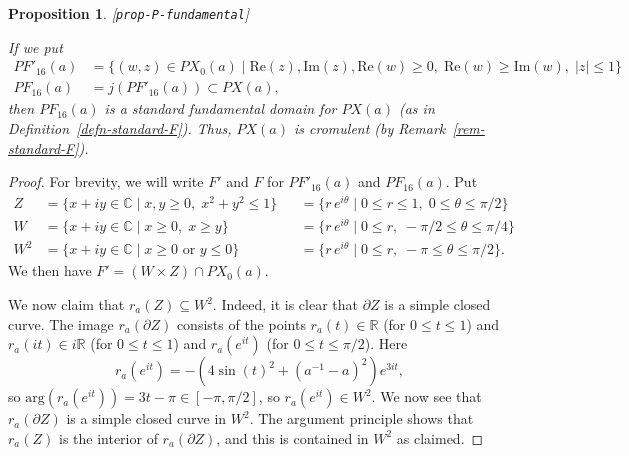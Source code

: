 \documentclass[reqno]{amsart}
\newcommand{\lbl}[1]{\label{#1}\textup{[\texttt{#1}]}\par}
\newcommand{\lbl}{\label}
\newcommand{\tht}       {\theta}
\newcommand{\R}         {{\mathbb{R}}}
\newcommand{\C}         {{\mathbb{C}}}
\newcommand{\st}        {\;|\;}
\newcommand{\tm}        {\times}
\newcommand{\sse}       {\subseteq}
\renewcommand{\:}{\colon}
\newtheorem{proposition}[theorem]{Proposition}
\theoremstyle{definition}
\begin{document}
\begin{proposition}\lbl{prop-P-fundamental}
 If we put
 \begin{align*}
  PF'_{16}(a) &= \{(w,z)\in PX_0(a)\st
           \text{Re}(z),\text{Im}(z),\text{Re}(w)\geq 0,\;
           \text{Re}(w)\geq\text{Im}(w),\;|z|\leq 1\} \\
  PF_{16}(a) &= j(PF'_{16}(a))\subset PX(a),
 \end{align*}
 then $PF_{16}(a)$ is a standard fundamental domain for $PX(a)$ (as in
 Definition~\ref{defn-standard-F}).  Thus, $PX(a)$ is cromulent (by
 Remark~\ref{rem-standard-F}).
\end{proposition}
\begin{proof}
 For brevity, we will write $F'$ and $F$ for $PF'_{16}(a)$ and
 $PF_{16}(a)$.  Put
 \begin{align*}
  Z   &= \{x+iy\in\C\st x,y\geq 0,\;x^2+y^2\leq 1\} &
      &= \{r\,e^{i\tht}\st 0\leq r\leq 1,\;0\leq\tht\leq\pi/2\} \\
  W   &= \{x+iy\in\C\st x\geq 0,\; x\geq y\} &
      &= \{r\,e^{i\tht}\st 0\leq r,\; -\pi/2\leq\tht\leq\pi/4\} \\
  W^2 &= \{x+iy\in\C\st x\geq 0 \text{ or } y\leq 0\} &
      &= \{r\,e^{i\tht}\st 0\leq r,\; -\pi\leq\tht\leq\pi/2\}.
 \end{align*}
 We then have $F'=(W\tm Z)\cap PX_0(a)$.

 We now claim that $r_a(Z)\sse W^2$.  Indeed, it is clear that
 $\partial Z$ is a simple closed curve.  The image $r_a(\partial Z)$
 consists of the points $r_a(t)\in\R$ (for $0\leq t\leq 1$) and
 $r_a(it)\in i\R$ (for $0\leq t\leq 1$) and $r_a(e^{it})$ (for
 $0\leq t\leq\pi/2$).  Here
 \[ r_a(e^{it}) = - (4\sin(t)^2+(a^{-1}-a)^2) e^{3it}, \]
 so $\text{arg}(r_a(e^{it}))=3t-\pi\in[-\pi,\pi/2]$, so
 $r_a(e^{it})\in W^2$.  We now see that $r_a(\partial Z)$ is a simple
 closed curve in $W^2$.  The argument principle shows that $r_a(Z)$ is
 the interior of $r_a(\partial Z)$, and this is contained in $W^2$ as
 claimed.


\end{proof}
\end{document}
